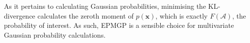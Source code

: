 \documentclass[twoside,11pt]{article}
\def\x{{\mathbf x}}
\def\regionA{\mathcal{A}}
\begin{document}
As it pertains to calculating Gaussian probabilities, minimising the KL-divergence calculates the zeroth moment of $p(\x)$, which is exactly $F(\regionA)$, the probability of interest.  As such, EPMGP is a sensible choice for multivariate Gaussian probability calculations.





\newpage


\end{document}
